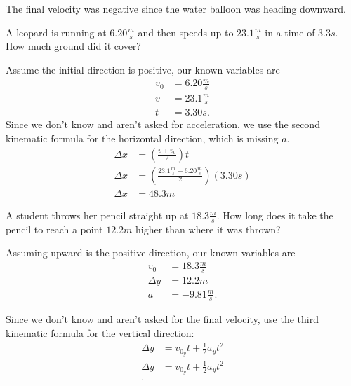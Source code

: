 \begin{note}[]
	The final velocity was negative since the water balloon was heading downward.
\end{note}

\begin{example}[Second kinematic formula, $\Delta x = \left( \frac{v + v_0}{2} \right) t$]
	A leopard is running at $6.20 \frac{m}{s}$ and then speeds up to $23.1 \frac{m}{s}$
	in a time of $3.3 s$. How much ground did it cover?
\end{example}
\begin{solution}[]
	Assume the initial direction is positive, our known variables are
	\begin{align*}
		v_0 &=  6.20 \frac{m}{s} \\
		v &= 23.1 \frac{m}{s} \\
		t &= 3.30 s
	.\end{align*}
	Since we don't know and aren't asked for acceleration, we use the second kinematic
	formula for the horizontal direction, which is missing $a$.
	\begin{align*}
		\Delta x &=  \left( \frac{v + v_0}{2} \right) t \\
		\Delta x &=  \left( \frac{23.1 \frac{m}{s} + 6.20 \frac{m}{s}}{2} \right) (3.30 s) \\
		\Delta x &= 48.3 m
	\end{align*}
\end{solution}

\begin{example}[third kinematic formula, $\Delta x = v_0t + \frac{1}{2} a t^2$]
	A student throws her pencil straight up at $18.3 \frac{m}{s}$. How long
	does it take the pencil to reach a point $12.2m$ higher than where
	it was thrown?
\end{example}
\begin{solution}[]
	Assuming upward is the positive direction, our known variables are
	\begin{align*}
		v_0 &=  18.3 \frac{m}{s} \\
		\Delta y &=  12.2 m \\
		a &= -9.81 \frac{m}{s}
	.\end{align*}

	Since we don't know and aren't asked for the final velocity, use the third
	kinematic formula for the vertical direction:
	\begin{align*}
		\Delta y &=  v_{0_y} t + \frac{1}{2}a_y t^2 \\
		\Delta y &= v_{0_y}t + \frac{1}{2}a_yt^2 \\
	.\end{align*}
\end{solution}

